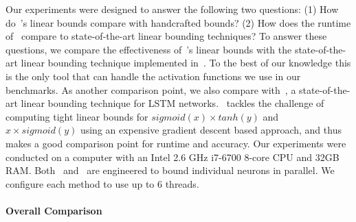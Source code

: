 Our experiments were designed to answer the following two questions:
(1) How do~\Name{}'s linear bounds compare with handcrafted bounds?
(2) How does the runtime of~\Name{} compare to state-of-the-art linear
bounding techniques?
To answer these questions, we compare the effectiveness of~\Name{}'s
linear bounds with the state-of-the-art linear bounding technique
implemented in~\autolipra{}. To the best of our knowledge this is the only tool
that can handle the activation functions we use in our benchmarks.
As another comparison point, we also compare
with~\popqorn{}, a state-of-the-art linear bounding technique for LSTM
networks.~\popqorn{} tackles the challenge of computing tight linear bounds for
$ sigmoid(x) \times tanh(y) $ and $ x \times sigmoid(y) $ using an expensive
gradient descent based approach, and thus makes a good comparison point for
runtime and accuracy.
%
Our experiments were conducted on a computer with an Intel 2.6 GHz i7-6700
8-core CPU and 32GB RAM.
%
Both~\autolipra{} and~\Name{} are engineered to bound individual neurons in
parallel. We configure each method to use up to 6 threads.

\paragraph{Overall Comparison}

